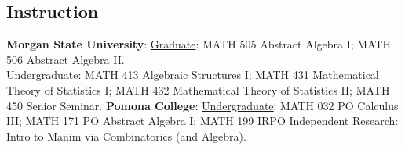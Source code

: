 \documentclass[10pt,a4paper]{article}
\newcommand{\MSU}{Morgan State University}
\newcommand{\Pomona}{Pomona College}
\begin{document}
\subsection{Instruction}
\textbf{\MSU}:
\href{https://catalog.morgan.edu/preview_program.php?catoid=27&poid=6251&returnto=1998}{Graduate}: MATH 505 Abstract Algebra I; MATH 506 Abstract Algebra II.\\
\href{https://catalog.morgan.edu/preview_program.php?catoid=26&poid=6079}{Undergraduate}: MATH 413 Algebraic Structures I; MATH 431 Mathematical Theory of Statistics I; MATH 432 Mathematical Theory of Statistics II; MATH 450 Senior Seminar. \textbf{\Pomona}:
\href{https://catalog.pomona.edu/content.php?filter%5B27%5D=MATH&filter%5B29%5D=&filter%5Bcourse_type%5D=-1&filter%5Bkeyword%5D=&filter%5B32%5D=1&filter%5Bcpage%5D=1&cur_cat_oid=43&expand=&navoid=8669&search_database=Filter&filter%5Bexact_match%5D=1#acalog_template_course_filter}{Undergraduate}: MATH 032 PO Calculus III; MATH 171 PO Abstract Algebra I; MATH 199 IRPO Independent Research: Intro to Manim via Combinatorics (and Algebra).
\end{document}
